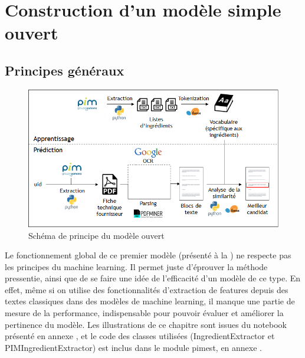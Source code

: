     \chapter{Construction d'un modèle simple \og ouvert \fg}
        
        \section{Principes généraux}

            \begin{figure}[htbp]
                \begin{center}
                \includegraphics[width=0.9\linewidth]{img/open_model.png}
                \end{center}
                \caption{Schéma de principe du \og modèle ouvert \fg}
                \label{fig:open_model}
            \end{figure}     

            Le fonctionnement global de ce premier modèle (présenté à la ) ne respecte pas les principes du machine learning.
            Il permet juste d'éprouver la méthode pressentie, ainsi que de se faire une idée de l'efficacité d'un modèle de ce type.
            En effet, même si on utilise des fonctionnalités d'extraction de features depuis des textes classiques dans des modèles de machine learning, il manque une partie de mesure de la performance, indispensable pour pouvoir évaluer et améliorer la pertinence du modèle.
            Les illustrations de ce chapitre sont issues du notebook présenté en annexe , et le code des classes utilisées (IngredientExtractor et PIMIngredientExtractor) est inclus dans le module pimest, en annexe .

